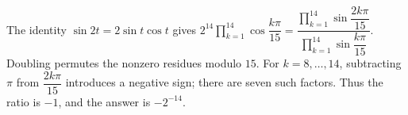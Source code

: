 The identity $\sin2t=2\sin t\cos t$ gives $2^{14}\prod_{k=1}^{14}\cos\dfrac{k\pi}{15}=\dfrac{\prod_{k=1}^{14}\sin\dfrac{2k\pi}{15}}{\prod_{k=1}^{14}\sin\dfrac{k\pi}{15}}$. Doubling permutes the nonzero residues modulo $15$. For $k=8,\ldots,14$, subtracting $\pi$ from $\dfrac{2 k \pi}{15}$ introduces a negative sign; there are seven such factors. Thus the ratio is $-1$, and the answer is $\boxed{-2^{-14}}$.
